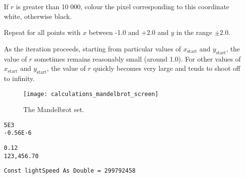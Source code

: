 \begin{EXE}
				If $r$ is greater than 10 000, colour the pixel corresponding to this coordinate white, otherwise black.
				
				Repeat for all points with $x$ between -1.0 and +2.0 and $y$ in the range $\pm 2.0$.
				
				As the iteration proceeds, starting from particular values of $x_\text{start}$ and $y_\text{start}$, the value of $r$ sometimes remains reasonably small (around 1.0). For other values of $x_\text{start}$ and $y_\text{start}$, the value of $r$ quickly becomes very large and tends to shoot off to infinity.
				\begin{figure}[bth]
					\centering
					\texttt{[image: calculations\_mandelbrot\_screen]}
					\caption{The Mandelbrot set.}
					\label{fig:calculations_mandelbrot_screen}
				\end{figure}
		\end{EXE}

		\begin{stab}
			\begin{enumChapter}
			\item
				\begin{lstlisting}
5E3
-0.56E-6
				\end{lstlisting}
			\item	
				\begin{lstlisting}
0.12
123,456.70
				\end{lstlisting}
			\item
				\begin{lstlisting}
Const lightSpeed As Double = 299792458
				\end{lstlisting}
		\end{enumChapter}
	 \end{stab}
